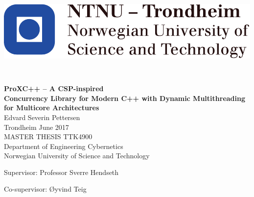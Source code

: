 
\thispagestyle{empty}

\begin{center}
\includegraphics{fig/NTNU}
\end{center}

\mbox{}\\[6pc]
\begin{center}
\huge\textbf{ProXC++ -- A CSP\hyp{}inspired\\ Concurrency Library for Modern C++ with Dynamic Multithreading for Multicore Architectures}\\[2pc]

\Large{Edvard Severin Pettersen}\\[1pc]
\large{Trondheim June 2017}\\[2pc]

MASTER THESIS TTK4900\\
Department of Engineering Cybernetics\\
Norwegian University of Science and Technology
\end{center}
\vfill

\noindent Supervisor: Professor Sverre Hendseth

\noindent Co-supervisor: Øyvind Teig

\afterpage{\blankpage}

